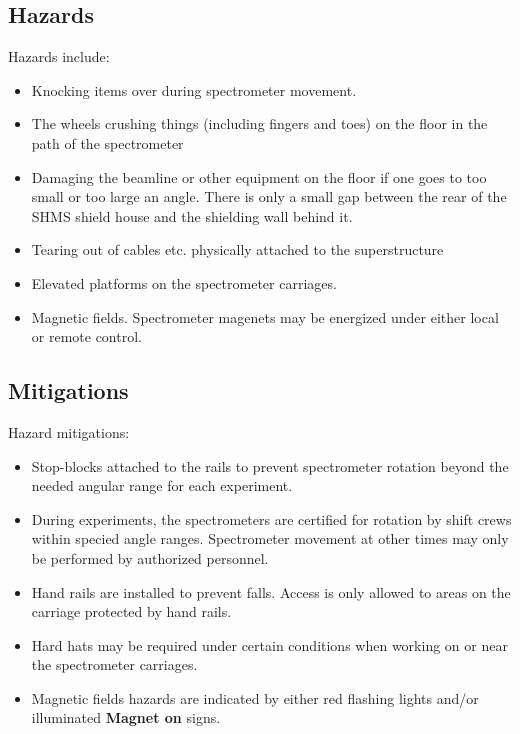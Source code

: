 \begin{safetyen}{0}{0}
\subsection{Hazards}

Hazards include:
\begin{itemize}
\item{Knocking items over during spectrometer movement.}
\item{The wheels crushing things (including fingers and toes) on the floor in the path of the
spectrometer}
\item{Damaging the beamline or other equipment on the floor if one goes to too small
or too large an angle.  There is
only a small gap between the rear of the SHMS shield house and the shielding wall
behind it.}
\item{Tearing out of cables etc. physically attached to the superstructure}
\item{Elevated platforms on the spectrometer carriages.}
\item{Magnetic fields.  Spectrometer magenets may be energized under either
local or remote control.}
\end{itemize}

\subsection{Mitigations}
Hazard mitigations:
\begin{itemize}
	\item{Stop-blocks attached to the rails to prevent spectrometer rotation beyond
	the needed angular range for each experiment.}
	\item{During experiments, the spectrometers are certified for rotation by
	shift crews within specied angle ranges.  Spectrometer movement at other times
	may only be performed by authorized personnel.}
	\item{Hand rails are installed to prevent falls.  Access is only allowed to
	areas on the carriage protected by hand rails.}
	\item{Hard hats may be required under certain conditions when working on or
	near the spectrometer carriages.}
	\item{Magnetic fields hazards are indicated by either red flashing lights and/or
	illuminated \textbf{Magnet on} signs.}
\end{itemize}
\end{safetyen}

